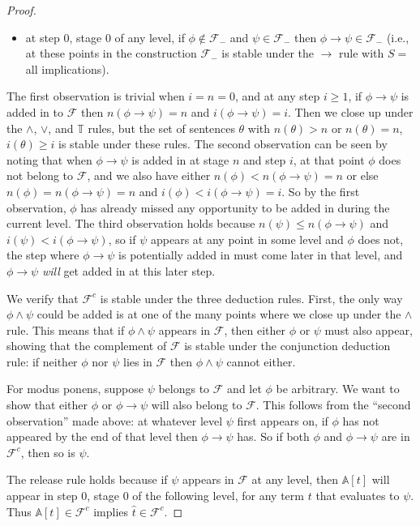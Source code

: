 \documentclass{amsart}
\theoremstyle{definition}
\begin{document}
\begin{proof}
\begin{itemize}
  \item at step 0, stage 0 of any level, if $\phi \not\in \mathcal{F}_-$ and $\psi \in \mathcal{F}_-$ then
    $\phi \to \psi \in \mathcal{F}_-$ (i.e., at these points in the construction $\mathcal{F}_-$ is stable under
    the $\to$ rule with $S =$ all implications).
  \end{itemize}
  The first observation is trivial when $i = n = 0$, and at any step $i \geq 1$, if $\phi \to \psi$ is added in
  to $\mathcal{F}$ then $n(\phi \to \psi) = n$ and $i(\phi \to \psi) = i$. Then we close up under the $\wedge$, $\vee$, and
  $\mathbb{T}$ rules, but the set of sentences $\theta$ with $n(\theta) > n$ or $n(\theta) = n$, $i(\theta) \geq i$ is
  stable under these rules. The second observation can be seen by noting that when $\phi \to \psi$ is added in at
  stage $n$ and step $i$, at that point $\phi$ does not belong to $\mathcal{F}$, and we also have either
  $n(\phi) < n(\phi \to \psi) = n$ or else $n(\phi) = n(\phi \to \psi) = n$ and $i(\phi) < i(\phi \to \psi) = i$.
  So by the first observation, $\phi$ has already missed any opportunity to be
  added in during the current level. The third observation holds because $n(\psi) \leq n(\phi \to \psi)$
  and $i(\psi) < i(\phi \to \psi)$, so if $\psi$ appears at any point in some level and $\phi$ does not,
  the step where $\phi \to \psi$ is
  potentially added in must come later in that level, and $\phi \to \psi$ {\it will} get added in at this later step.

  We verify that $\mathcal{F}^c$ is stable under the three deduction rules. First, the only way $\phi \wedge \psi$
  could be added is at one of the many points where we close up under the $\wedge$ rule. This means that
  if $\phi \wedge \psi$ appears in $\mathcal{F}$, then either $\phi$ or $\psi$ must also appear, showing
  that the complement of $\mathcal{F}$ is stable under the conjunction deduction rule: if neither
  $\phi$ nor $\psi$ lies in $\mathcal{F}$ then $\phi \wedge \psi$ cannot either.

  For modus ponens, suppose $\psi$ belongs to $\mathcal{F}$ and let $\phi$ be arbitrary. We want to show that
  either $\phi$ or $\phi \to \psi$ will also belong to $\mathcal{F}$. This follows from the ``second observation''
  made above: at whatever level $\psi$ first appears on, if $\phi$ has not appeared by the end of that level then
  $\phi \to \psi$ has. So if both $\phi$ and $\phi \to \psi$ are in $\mathcal{F}^c$, then so is $\psi$.

  The release rule holds because if $\psi$ appears in $\mathcal{F}$ at any level, then $\mathbb{A}[t]$ will
  appear in step 0, stage 0 of the following level, for any term $t$ that evaluates to $\psi$. Thus $\mathbb{A}[t] \in
  \mathcal{F}^c$ implies $\hat{t} \in \mathcal{F}^c$.


\end{proof}
\end{document}
